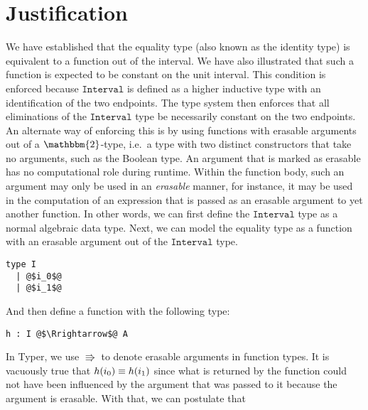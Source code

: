 \documentclass[12pt,twoside,maitrise]{dms}
\theoremstyle{definition}
\numberwithin{equation}{section}
\numberwithin{table}{chapter}
\numberwithin{figure}{chapter}
\newcommand\id[1] {\texttt{#1}}
\begin{document}
\section{Justification}\label{sec:eq-justification}
We have established that the equality type (also known as the identity type) is
equivalent to a function out of the interval. We have also illustrated that such
a function is expected to be constant on the unit interval. This condition is
enforced because $\id{Interval}$ is defined as a higher
inductive type\cite{HoTTbook} with an identification of the two endpoints. The
type system then enforces that all eliminations of the $\id{Interval}$ type be
necessarily constant on the two endpoints. An alternate way of enforcing this is
by using functions with erasable arguments out of a $\mathbbm{2}$-type, i.e.\ a
type with two distinct constructors that take no arguments, such as the Boolean
type. An argument that is marked as erasable has no computational
role during runtime. Within the function body, such an argument may only be used
in an \emph{erasable} manner, for instance, it may be used in the computation of
an expression that is passed as an erasable argument to yet another function. In
other words, we can first define the $\id{Interval}$ type as a normal algebraic
data type. Next, we can model the equality type as a function with an erasable
argument out of the $\id{Interval}$ type.

\begin{verbatim}
type I
  | @$i_0$@
  | @$i_1$@
\end{verbatim}

And then define a function with the following type:

\begin{verbatim}
h : I @$\Rrightarrow$@ A
\end{verbatim}

In Typer, we use $\Rrightarrow$ to denote erasable arguments in function types.
It is vacuously true that $\eqtype{h(i_0)}{h(i_1)}$ since what is returned by
the function could not have been influenced by the argument that was passed to
it because the argument is erasable. With that, we can postulate that
\end{document}
